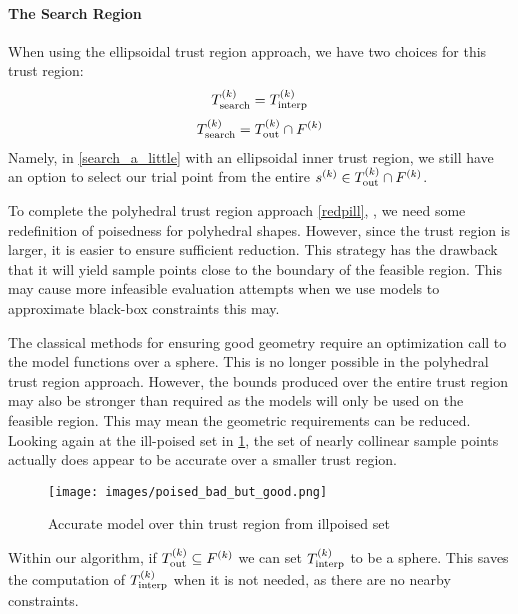 \paragraph{The Search Region}
\label{search_region_choices}
When using the ellipsoidal trust region approach, we have two choices for this trust region:
\begin{align}
{T_{\text{search}}^{(k)}} = {T_{\text{interp}}^{(k)}} \label{search_a_little}
\end{align}
\begin{align}
{T_{\text{search}}^{(k)}} = {T_{\text{out}}^{(k)}} \cap {F}^{(k)} \label{search_a_lot}
\end{align}
Namely, in \cref{search_a_little} with an ellipsoidal inner trust region, we still have an option to select our trial point from the entire ${{s}^{(k)}} \in {T_{\text{out}}^{(k)}} \cap {F}^{(k)}$.

To complete the polyhedral trust region approach \cref{redpill}, %
, we need some redefinition of poisedness for polyhedral shapes.
However, since the trust region is larger, it is easier to ensure sufficient reduction.
This strategy has the drawback that it will yield sample points close to the boundary of the feasible region.
This may cause more infeasible evaluation attempts when we use models to approximate black-box constraints this may.

The classical methods for ensuring good geometry require an optimization call to the model functions over a sphere.
This is no longer possible in the polyhedral trust region approach.
However, the bounds produced over the entire trust region may also be stronger than required as the models will only be used on the feasible region.
This may mean the geometric requirements can be reduced.
Looking again at the ill-poised set in \cref{aoip}, the set of nearly collinear sample points actually does appear to be accurate over a smaller trust region.


\begin{figure}[h]
    \centering
    \texttt{[image: images/poised\_bad\_but\_good.png]}
    \caption{Accurate model over thin trust region from illpoised set}
    \label{aoip}
\end{figure}


Within our algorithm, if $ {T_{\text{out}}^{(k)}} \subseteq {F}^{(k)}$ we can set $ {T_{\text{interp}}^{(k)}} $ to be a sphere.
This saves the computation of $ {T_{\text{interp}}^{(k)}} $ when it is not needed, as there are no nearby constraints.






